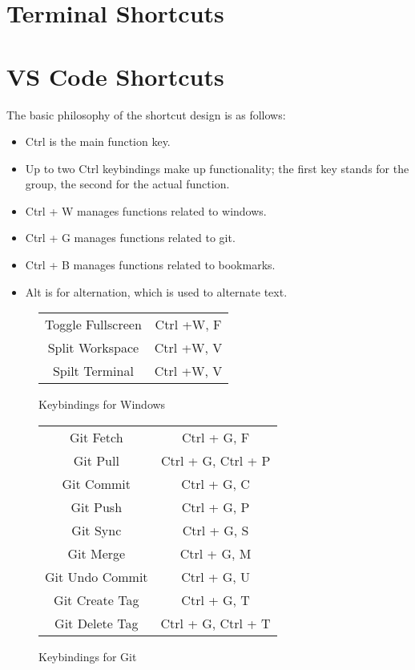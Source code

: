 \documentclass[10pt]{article}
\begin{document}
\section{Terminal Shortcuts} \label{S_Terminal}


\section{VS Code Shortcuts} \label{S_VSCode}
	The basic philosophy of the shortcut design is as follows:

	\begin{itemize}
		\item Ctrl is the main function key.
		\item Up to two Ctrl keybindings make up functionality; the first key stands for the group, the second for the actual function.
		\item Ctrl + W manages functions related to windows.
		\item Ctrl + G manages functions related to git.
		\item Ctrl + B manages functions related to bookmarks.
		\item Alt is for alternation, which is used to alternate text.
	\end{itemize}

	\begin{figure}[H]
		\centering
		\begin{tabular}{@{}c c@{}}
			\midrule

			Toggle Fullscreen & Ctrl +W, F \\
			Split Workspace & Ctrl +W, V \\
			Spilt Terminal & Ctrl +W, V \\

			\bottomrule
		\end{tabular}
		\caption{Keybindings for Windows}
	\end{figure}

	\begin{figure}[H]
		\centering
		\begin{tabular}{@{}c c@{}}
			\midrule

			Git Fetch & Ctrl + G, F \\
			Git Pull & Ctrl + G, Ctrl + P \\
			Git Commit & Ctrl + G, C \\
			Git Push & Ctrl + G, P \\
			Git Sync & Ctrl + G, S \\
			Git Merge & Ctrl + G, M \\
			Git Undo Commit & Ctrl + G, U \\
			Git Create Tag & Ctrl + G, T \\
			Git Delete Tag & Ctrl + G, Ctrl + T \\

			\bottomrule
		\end{tabular}
		\caption{Keybindings for Git}
	\end{figure}
\end{document}
